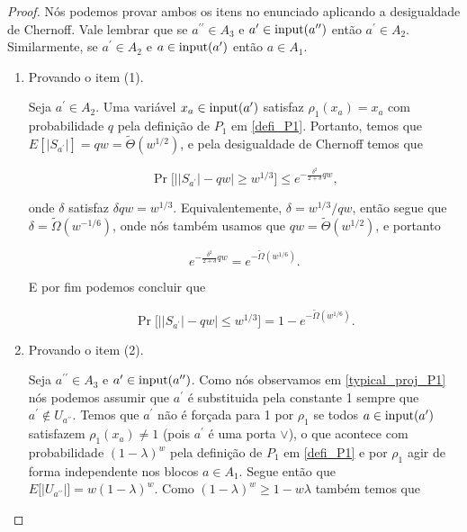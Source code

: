 \begin{proof}

Nós podemos provar ambos os itens no enunciado aplicando a desigualdade de Chernoff. Vale lembrar que se $a^{\prime \prime} \in A_{3}$ e $a^{\prime} \in \text{input}(a^{\prime \prime})$ então $a^{\prime} \in A_{2}$. Similarmente, se $a^{\prime} \in A_{2}$ e $a \in \text{input}(a^{\prime})$ então $a \in A_{1}$.

\begin{enumerate}

	\item Provando o item (1).
	
	Seja $a^{\prime} \in A_{2}$. Uma variável $x_{a} \in \text{input}(a^{\prime})$  satisfaz $\rho_{1}(x_{a}) = x_{a}$ com probabilidade $q$ pela definição de $P_{1}$ em \ref{defi_P1}. Portanto, temos que $E[\lvert S_{a^{\prime}} \rvert] = qw = \widetilde{\Theta}(w^{1/2})$, e pela desigualdade de Chernoff temos que
	
	\begin{equation*}
		\Pr \Big[\big\lvert \lvert S_{a^{\prime}} \rvert - qw \big\rvert \geq w^{1/3} \Big] \leq e^{-\frac{\delta^{2}}{2 + \delta}qw},
	\end{equation*}
	
	onde $\delta$ satisfaz $\delta qw = w^{1/3}$. Equivalentemente, $\delta = w^{1/3}/qw$, então segue que $\delta = \widetilde{\Omega}(w^{-1/6})$, onde nós também usamos que $qw = \widetilde{\Theta}(w^{1/2})$, e portanto
	
	\begin{equation*}
		e^{-\frac{\delta^{2}}{2 + \delta}qw} = e^{-\widetilde{\Omega}(w^{1/6})}.
	\end{equation*}
	
	E por fim podemos concluir que
	
	\begin{equation*}
		\Pr \Big[ \big\lvert \lvert S_{a^{\prime}} \rvert - qw \big\rvert \leq w^{1/3}\Big] = 1 - e^{-\widetilde{\Omega}(w^{1/6})}.
	\end{equation*}
	
	
	\item Provando o item (2).
	
	Seja $a^{\prime \prime} \in A_{3}$ e $a^{\prime} \in \text{input}(a^{\prime \prime})$. Como nós observamos em \ref{typical_proj_P1} nós podemos assumir que $a^{\prime}$ é substituida pela constante 1 sempre que $a^{\prime} \not\in U_{a^{\prime \prime}}$. Temos que $a^{\prime}$ não é forçada para 1 por $\rho_{1}$ se todos $a \in \text{input}(a^{\prime})$ satisfazem $\rho_{1}(x_{a}) \neq 1$ (pois $a^{\prime}$ é uma porta $\lor$), o que acontece com probabilidade $(1 - \lambda)^{w}$ pela definição de $P_{1}$ em \ref{defi_P1} e por $\rho_{1}$ agir de forma independente nos blocos $a \in A_{1}$. Segue então que $E \big[ \lvert U_{a^{\prime \prime}} \rvert \big] = w(1 - \lambda)^{w}$. Como $(1 - \lambda)^{w} \geq 1 - w\lambda$ também temos que
	

\end{enumerate}
\end{proof}

